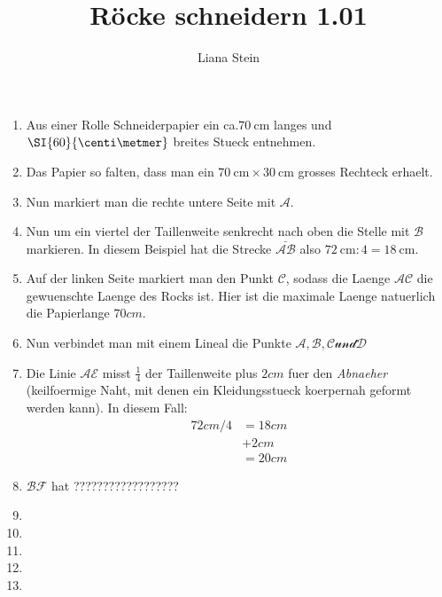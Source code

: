 \documentclass{scrartcl}
\begin{document}
  \title{R\"ocke schneidern 1.01}
  \author{Liana Stein}
\maketitle

\begin{enumerate}
  \item Aus einer Rolle Schneiderpapier ein ca.$\SI{70}{\centi\meter}$ langes
    und $\SI{60}{\centi\metmer}$ breites Stueck entnehmen.
  \item Das Papier so falten, dass man ein $\SI{70}{\centi\meter}\times
    \SI{30}{\centi\meter}$ grosses Rechteck erhaelt.
  \item Nun markiert man die rechte untere Seite mit $\mathcal{A}$.
  \item Nun um ein viertel der Taillenweite senkrecht nach oben die Stelle mit 
    $\mathcal{B}$ markieren. In diesem Beispiel hat die Strecke
    $\bar{\mathcal{AB}}$ also $\SI{72}{\centi\meter}:4 = 
    \SI{18}{\centi\meter}$.
  \item Auf der linken Seite markiert man den Punkt $\mathcal{C}$, sodass
    die Laenge $\mathcal{AC}$ die gewuenschte Laenge des Rocks ist. Hier ist
    die maximale Laenge natuerlich die Papierlange $70 cm$.
  \item Nun verbindet man mit einem Lineal die Punkte $\mathcal{A,B,C und D}$
  \item Die Linie $\mathcal{AE}$ misst $\frac{1}{4}$ der Taillenweite plus
    $2 cm$ fuer den \emph{Abnaeher} (keilfoermige Naht, mit denen ein
    Kleidungsstueck koerpernah geformt werden kann). In diesem Fall:
    \begin{align}
      72 cm / 4 &= 18 cm \\
      		&+ 2 cm \\
		&= 20 cm
      \label{abnaeher}
    \end{align}
  \item $\mathcal{BF}$ hat ??????????????????
  \item 
  \item
  \item
  \item
  \item
\end{enumerate}
\end{document}
